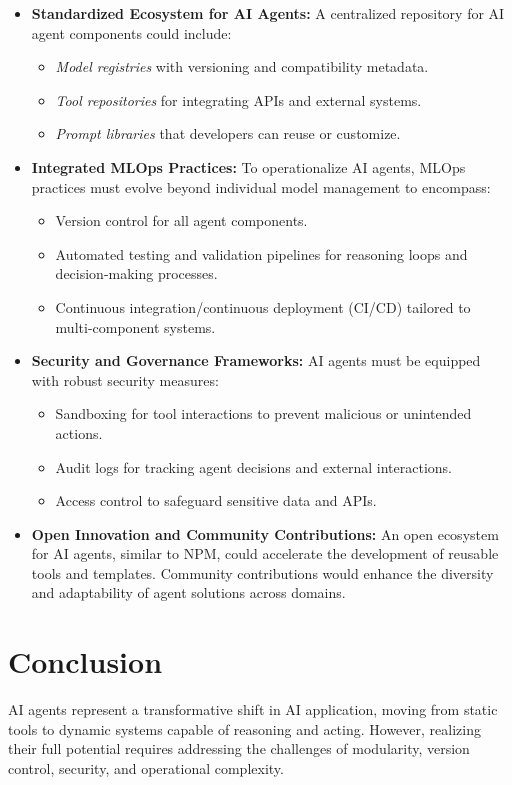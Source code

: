 \documentclass[12pt,twocolumn]{article}
\begin{document}
\begin{itemize}
    \item \textbf{Standardized Ecosystem for AI Agents:} A centralized repository for AI agent components could include:
    \begin{itemize}
        \item \textit{Model registries} with versioning and compatibility metadata.
        \item \textit{Tool repositories} for integrating APIs and external systems.
        \item \textit{Prompt libraries} that developers can reuse or customize.
    \end{itemize}
    \item \textbf{Integrated MLOps Practices:} To operationalize AI agents, MLOps practices must evolve beyond individual model management to encompass:
    \begin{itemize}
        \item Version control for all agent components.
        \item Automated testing and validation pipelines for reasoning loops and decision-making processes.
        \item Continuous integration/continuous deployment (CI/CD) tailored to multi-component systems.
    \end{itemize}
    \item \textbf{Security and Governance Frameworks:} AI agents must be equipped with robust security measures:
    \begin{itemize}
        \item Sandboxing for tool interactions to prevent malicious or unintended actions.
        \item Audit logs for tracking agent decisions and external interactions.
        \item Access control to safeguard sensitive data and APIs.
    \end{itemize}
    \item \textbf{Open Innovation and Community Contributions:} An open ecosystem for AI agents, similar to NPM, could accelerate the development of reusable tools and templates. Community contributions would enhance the diversity and adaptability of agent solutions across domains.
\end{itemize}

\section{Conclusion}

AI agents represent a transformative shift in AI application, moving from static tools to dynamic systems capable of reasoning and acting. However, realizing their full potential requires addressing the challenges of modularity, version control, security, and operational complexity.







\printbibliography%
\end{document}
